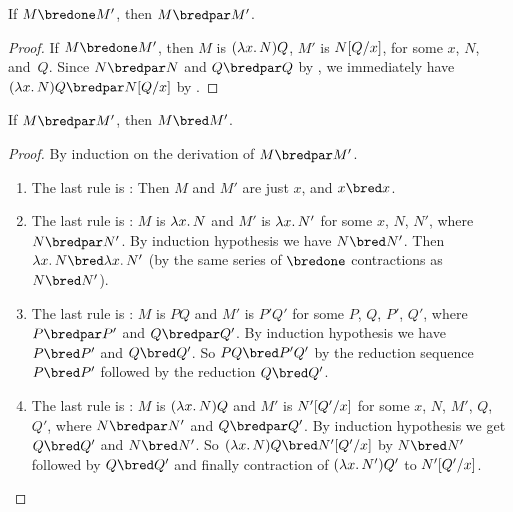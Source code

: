 \documentclass[../../../include/open-logic-section]{subfiles}
\begin{document}


\begin{lem}
  If $M \bredone M'$, then $M \bredpar M'$.
\end{lem}
\begin{proof} If $M \bredone M'$, then $M$ is
    $(\lambd[x][N])Q$, $M'$ is $N[Q/x]$, for some
    $x$, $N$, and~$Q$. Since $N \bredpar N$ and $Q \bredpar Q$ by
    , we immediately have $(\lambd[x][N])Q
    \bredpar \Subst{N}{Q}{x}$ by .
\end{proof}

\begin{lem}
  If $M \bredpar M'$, then $M \bred M'$.
\end{lem}

\begin{proof} By induction on the derivation of $M \bredpar M'$.
  \begin{enumerate}
  \item The last rule is : Then $M$ and $M'$
    are just $x$, and $x \bred x$.
  \item The last rule is : $M$ is 
    $\lambd[x][N]$ and $M'$ is $\lambd[x][N']$ for some $x$, $N$, $N'$, where
    $N \bredpar N'$. By induction hypothesis we have $N \bred N'$. Then
    $\lambd[x][N] \bred \lambd[x][N']$ (by the same series of
    $\bredone$ contractions as $N \bred N'$).
  \item The last rule is : $M$ is 
    $PQ$ and $M'$ is $P'Q'$ for some $P$, $Q$, $P'$, $Q'$, where $P \bredpar P'$
    and $Q \bredpar Q'$. By induction hypothesis we have $P \bred P'$ and $Q \bred
    Q'$.  So $PQ \bred P'Q'$ by the reduction sequence $P \bred P'$ followed
    by the reduction $Q \bred Q'$.
  \item The last rule is : $M$ is
    $(\lambd[x][N])Q$ and $M'$ is  $N'[Q'/x]$ for some $x$,
    $N$, $M'$, $Q$, $Q'$, where $N \bredpar N'$ and $Q \bredpar Q'$.
    By induction hypothesis we get $Q \bred Q'$ and $N \bred N'$. So
    $(\lambd[x][N])Q \bred \Subst{N'}{Q'}{x}$ by $N \bred N'$ followed
    by $Q \bred Q'$ and finally contraction of $(\lambd[x][N'])Q'$ to
    $N'[Q'/x]$.
  \end{enumerate}
\end{proof}
\end{document}
